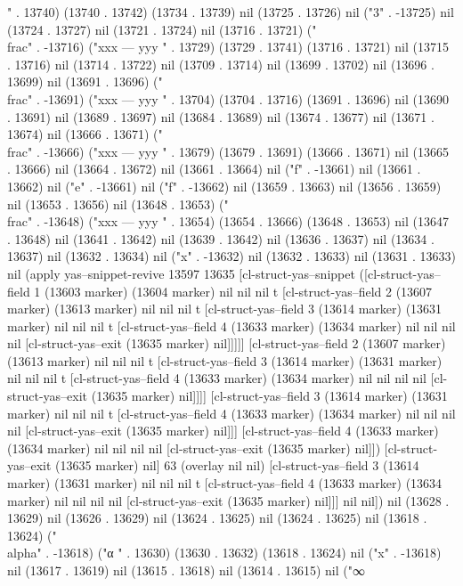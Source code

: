 {" . 13740) (13740 . 13742) (13734 . 13739) nil (13725 . 13726) nil ("3" . -13725) nil (13724 . 13727) nil (13721 . 13724) nil (13716 . 13721) ("\\frac" . -13716) ("xxx
---
yyy
" . 13729) (13729 . 13741) (13716 . 13721) nil (13715 . 13716) nil (13714 . 13722) nil (13709 . 13714) nil (13699 . 13702) nil (13696 . 13699) nil (13691 . 13696) ("\\frac" . -13691) ("xxx
---
yyy
" . 13704) (13704 . 13716) (13691 . 13696) nil (13690 . 13691) nil (13689 . 13697) nil (13684 . 13689) nil (13674 . 13677) nil (13671 . 13674) nil (13666 . 13671) ("\\frac" . -13666) ("xxx
---
yyy
" . 13679) (13679 . 13691) (13666 . 13671) nil (13665 . 13666) nil (13664 . 13672) nil (13661 . 13664) nil ("f" . -13661) nil (13661 . 13662) nil ("e" . -13661) nil ("f" . -13662) nil (13659 . 13663) nil (13656 . 13659) nil (13653 . 13656) nil (13648 . 13653) ("\\frac" . -13648) ("xxx
---
yyy
" . 13654) (13654 . 13666) (13648 . 13653) nil (13647 . 13648) nil (13641 . 13642) nil (13639 . 13642) nil (13636 . 13637) nil (13634 . 13637) nil (13632 . 13634) nil ("x" . -13632) nil (13632 . 13633) nil (13631 . 13633) nil (apply yas--snippet-revive 13597 13635 [cl-struct-yas--snippet ([cl-struct-yas--field 1 (13603 marker) (13604 marker) nil nil nil t [cl-struct-yas--field 2 (13607 marker) (13613 marker) nil nil nil t [cl-struct-yas--field 3 (13614 marker) (13631 marker) nil nil nil t [cl-struct-yas--field 4 (13633 marker) (13634 marker) nil nil nil nil [cl-struct-yas--exit (13635 marker) nil]]]]] [cl-struct-yas--field 2 (13607 marker) (13613 marker) nil nil nil t [cl-struct-yas--field 3 (13614 marker) (13631 marker) nil nil nil t [cl-struct-yas--field 4 (13633 marker) (13634 marker) nil nil nil nil [cl-struct-yas--exit (13635 marker) nil]]]] [cl-struct-yas--field 3 (13614 marker) (13631 marker) nil nil nil t [cl-struct-yas--field 4 (13633 marker) (13634 marker) nil nil nil nil [cl-struct-yas--exit (13635 marker) nil]]] [cl-struct-yas--field 4 (13633 marker) (13634 marker) nil nil nil nil [cl-struct-yas--exit (13635 marker) nil]]) [cl-struct-yas--exit (13635 marker) nil] 63 (overlay nil nil) [cl-struct-yas--field 3 (13614 marker) (13631 marker) nil nil nil t [cl-struct-yas--field 4 (13633 marker) (13634 marker) nil nil nil nil [cl-struct-yas--exit (13635 marker) nil]]] nil nil]) nil (13628 . 13629) nil (13626 . 13629) nil (13624 . 13625) nil (13624 . 13625) nil (13618 . 13624) ("\\alpha" . -13618) ("α
" . 13630) (13630 . 13632) (13618 . 13624) nil ("x" . -13618) nil (13617 . 13619) nil (13615 . 13618) nil (13614 . 13615) nil ("∞
}
